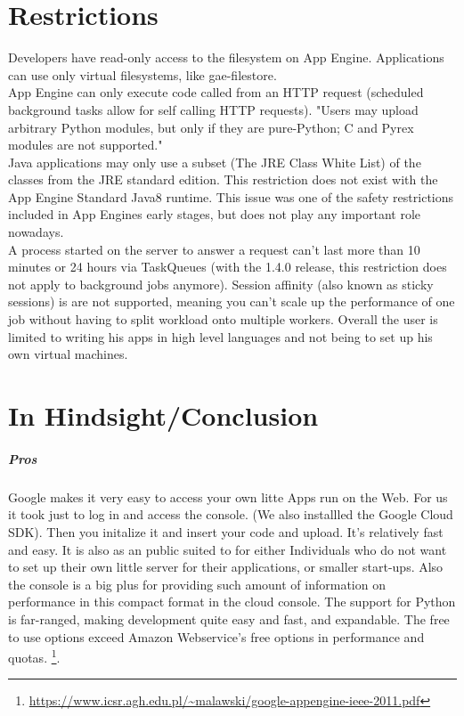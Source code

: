 \documentclass{article}
\begin{document}
\section{Restrictions}
    Developers have read-only access to the filesystem on App Engine. Applications can use only virtual filesystems, like gae-filestore.\\
    App Engine can only execute code called from an HTTP request (scheduled background tasks allow for self calling HTTP requests).
   "Users may upload arbitrary Python modules, but only if they are pure-Python; C and Pyrex modules are not supported."
    \\
    Java applications may only use a subset (The JRE Class White List) of the classes from the JRE standard edition. This restriction does not exist with the App Engine Standard Java8 runtime. This issue was one of the safety restrictions included in App Engines early stages, but does not play any important role nowadays.
    \\
    A process started on the server to answer a request can't last more than 10 minutes or 24 hours via TaskQueues (with the 1.4.0 release, this restriction does not apply to background jobs anymore).
   Session affinity (also known as sticky sessions) is are not supported, meaning you can't scale up the performance of one job without having to split workload onto multiple workers. 
    Overall the user is limited to writing his apps in high level languages and not being to set up his own virtual machines.
    
\section{In Hindsight/Conclusion}

\subparagraph{Pros}
Google makes it very easy to access your own litte Apps run on the Web. For us it took just to log in and access the console. (We also installled the Google Cloud SDK). Then you initalize it and insert your code and upload. It's relatively fast and easy. It is also as an public suited to for either Individuals who do not want to set up their own little server for their applications, or smaller start-ups. Also the console is a big plus for providing such amount of information on performance in this compact format in the cloud console. The support for Python is far-ranged, making development quite easy and fast, and expandable. The free to use options  exceed Amazon Webservice's free options in performance and quotas. \footnote{\url{https://www.icsr.agh.edu.pl/~malawski/google-appengine-ieee-2011.pdf}}. 
\end{document}
